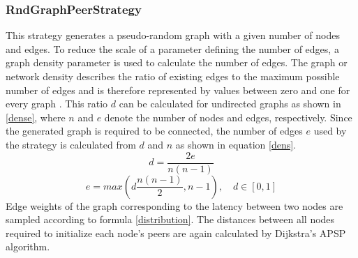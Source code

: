 \documentclass[a4paper,12pt,twoside]{report}
\begin{document}
\subsubsection{RndGraphPeerStrategy} \label{rndgraphstrategy}
This strategy generates a pseudo-random graph with a given number of nodes and edges. To reduce the scale of a parameter defining the number of edges, a graph density parameter is used to calculate the number of edges. The graph or network density describes the ratio of existing edges to the maximum possible number of edges and is therefore represented by values between zero and one for every graph \cite{density}. This ratio $d$ can be calculated for undirected graphs as shown in \autoref{dense}, where $n$ and $e$ denote the number of nodes and edges, respectively. Since the generated graph is required to be connected, the number of edges $e$ used by the strategy is calculated from $d$ and $n$ as shown in equation \ref{dens}. 
\begin{equation}\label{dense}
d = \frac{2e}{n\left( n-1\right) }
\end{equation}
\begin{equation}\label{dens}
e = max \left( d\frac{n\left( n-1\right) }{2}, n-1 \right),\quad d\in [0,1]
\end{equation}
Edge weights of the graph corresponding to the latency between two nodes are sampled according to formula \ref{distribution}. The distances between all nodes required to initialize each node's peers are again calculated by Dijkstra's APSP algorithm. 
\end{document}
